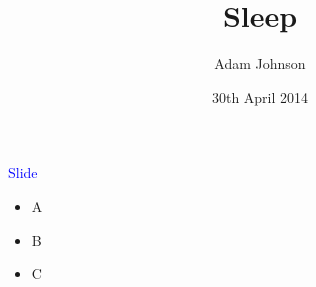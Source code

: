 \documentclass[landscape]{slides}
\title{Sleep}
\author{Adam Johnson}
\date{30th April 2014}
\begin{document}
\maketitle


\begin{slide}

    \textcolor{blue}{\Large{Slide}}

    \begin{itemize}
        \item A
        \item B
        \item C
    \end{itemize}

\end{slide}
\end{document}
